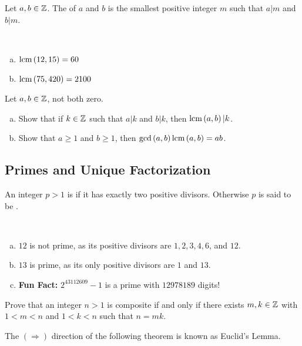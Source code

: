 \documentclass[11pt,fleqn,dvipsnames,usenames]{article}
\newcommand{\p}{\noindent}
\begin{document}
 Let $a,b\in\mathbb{Z}$.  The  of $a$ and $b$ is the smallest positive integer $m$ such that $a|m$ and $b|m$.
\vsp

\begin{examples}~
\begin{enumerate}[(a)]
\item $\text{lcm}\left(12, 15\right) = 60$
\item $\text{lcm}\left(75, 420\right) = 2100$ 
\end{enumerate}
\end{examples}
\vsp

\exercises Let $a,b\in\mathbb{Z}$, not both zero.
\begin{enumerate}[(a)]
\item Show that if $k\in\mathbb{Z}$ such that $a|k$ and $b|k$, then $\text{lcm}\left(a, b\right)|k$.
\item Show that $a\geq 1$ and $b\geq 1$, then $\text{gcd}\left(a, b\right)\text{lcm}\left(a, b\right) = ab$.
\end{enumerate}
\vsp

\subsection{Primes and Unique Factorization}

 An integer $p > 1$ is  if it has exactly two positive divisors.  Otherwise $p$ is said to be .
\vsp

\begin{examples}~
\begin{enumerate}[(a)]
\item $12$ is not prime, as its positive divisors are $1, 2, 3, 4, 6$, and $12$.
\item $13$ is prime, as its only positive divisors are $1$ and $13$.
\item \textbf{Fun Fact:} $2^{43112609} - 1$ is a prime with $12978189$ digits!
\end{enumerate}
\end{examples}
\vsp

\begin{exercise}
Prove that an integer $n>1$ is composite if and only if there exists $m,k\in\mathbb{Z}$ with $1 < m < n$ and $1 < k < n$ such that $n = mk$.
\end{exercise}
\vsp

\p The $(\Rightarrow)$ direction of the following theorem is known as Euclid's Lemma.
\vsp
\end{document}
